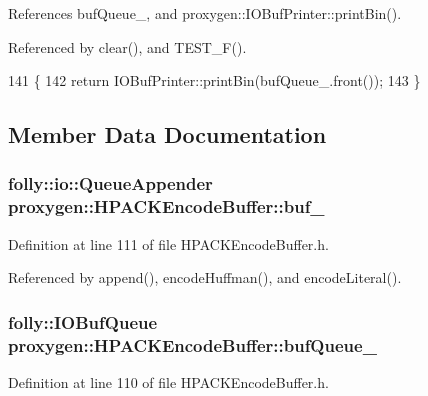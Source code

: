 References buf\+Queue\+\_\+, and proxygen\+::\+I\+O\+Buf\+Printer\+::print\+Bin().



Referenced by clear(), and T\+E\+S\+T\+\_\+\+F().


\begin{DoxyCode}
141                                 \{
142   \textcolor{keywordflow}{return} IOBufPrinter::printBin(bufQueue_.front());
143 \}
\end{DoxyCode}


\subsection{Member Data Documentation}
\subsubsection[{buf\+\_\+}]{\setlength{\rightskip}{0pt plus 5cm}folly\+::io\+::\+Queue\+Appender proxygen\+::\+H\+P\+A\+C\+K\+Encode\+Buffer\+::buf\+\_\+\hspace{0.3cm}{\ttfamily [private]}}\label{classproxygen_1_1HPACKEncodeBuffer_a3e6843672b7fefe3abb197f52633b015}


Definition at line 111 of file H\+P\+A\+C\+K\+Encode\+Buffer.\+h.



Referenced by append(), encode\+Huffman(), and encode\+Literal().

\subsubsection[{buf\+Queue\+\_\+}]{\setlength{\rightskip}{0pt plus 5cm}folly\+::\+I\+O\+Buf\+Queue proxygen\+::\+H\+P\+A\+C\+K\+Encode\+Buffer\+::buf\+Queue\+\_\+\hspace{0.3cm}{\ttfamily [private]}}\label{classproxygen_1_1HPACKEncodeBuffer_a47d0ed0e5780e4048bd4d89ea84e0268}


Definition at line 110 of file H\+P\+A\+C\+K\+Encode\+Buffer.\+h.



